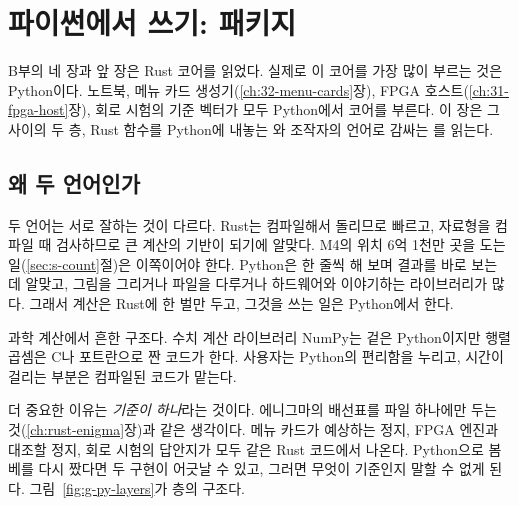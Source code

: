 \chapter{파이썬에서 쓰기: \texorpdfstring{}{christopher} 패키지}\label{ch:15-python-api}
\begingroup\setlength{\emergencystretch}{3em}%

B부의 네 장과 앞 장은 Rust 코어를 읽었다. 실제로 이 코어를 가장 많이 부르는 것은 Python이다. 노트북, 메뉴 카드
생성기(\ref{ch:32-menu-cards}장), FPGA 호스트(\ref{ch:31-fpga-host}장), 회로 시험의 기준 벡터가 모두 Python에서
코어를 부른다. 이 장은 그 사이의 두 층, Rust 함수를 Python에 내놓는 와 조작자의
언어로 감싸는 를 읽는다.

\section{왜 두 언어인가}\label{sec:py-why}

\Why 두 언어는 서로 잘하는 것이 다르다. Rust는 컴파일해서 돌리므로 빠르고, 자료형을 컴파일 때 검사하므로 큰
계산의 기반이 되기에 알맞다. M4의 위치 6억 1천만 곳을 도는 일(\ref{sec:s-count}절)은 이쪽이어야 한다. Python은
한 줄씩 해 보며 결과를 바로 보는 데 알맞고, 그림을 그리거나 파일을 다루거나 하드웨어와 이야기하는 라이브러리가
많다. 그래서 계산은 Rust에 한 벌만 두고, 그것을 쓰는 일은 Python에서 한다.

\General 과학 계산에서 흔한 구조다. 수치 계산 라이브러리 NumPy는 겉은 Python이지만 행렬 곱셈은 C나 포트란으로
짠 코드가 한다. 사용자는 Python의 편리함을 누리고, 시간이 걸리는 부분은 컴파일된 코드가 맡는다.

\Ours 더 중요한 이유는 \emph{기준이 하나}라는 것이다. 에니그마의 배선표를 파일 하나에만 두는 것(\ref{ch:rust-enigma}장)과
같은 생각이다. 메뉴 카드가 예상하는 정지, FPGA 엔진과 대조할 정지, 회로 시험의 답안지가 모두 같은 Rust 코드에서
나온다. Python으로 봄베를 다시 짰다면 두 구현이 어긋날 수 있고, 그러면 무엇이 기준인지 말할 수 없게 된다.
그림~\ref{fig:g-py-layers}가 층의 구조다.


